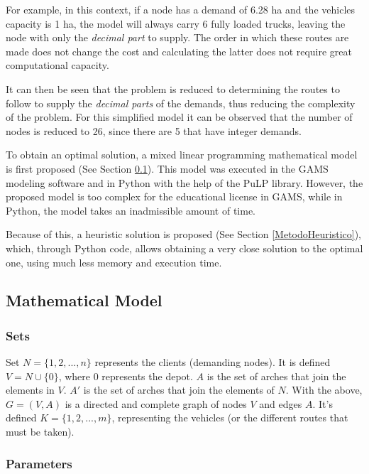 \documentclass{amsart}
\begin{document}
    For example, in this context, if a node has a demand of 6.28 ha and the vehicles capacity is 1 ha, the model will always carry 6 fully loaded trucks, leaving the node with only the \textit{decimal part} to supply. The order in which these routes are made does not change the cost and calculating the latter does not require great computational capacity.

    It can then be seen that the problem is reduced to determining the routes to follow to supply the \textit{decimal parts} of the demands, thus reducing the complexity of the problem. For this simplified model it can be observed that the number of nodes is reduced to 26, since there are 5 that have integer demands.

    To obtain an optimal solution, a mixed linear programming mathematical model is first proposed (See Section \ref{ModeloMatematico}). This model was executed in the GAMS modeling software and in Python with the help of the PuLP library. However, the proposed model is too complex for the educational license in GAMS, while in Python, the model takes an inadmissible amount of time.

        Because of this, a heuristic solution is proposed (See Section \ref{MetodoHeuristico}), which, through Python code, allows obtaining a very close solution to the optimal one, using much less memory and execution time.

    \subsection{Mathematical Model}\label{ModeloMatematico}
        \subsubsection{Sets} 
        
        
        Set $N=\{1, 2, ... , n\}$ represents the clients (demanding nodes). It is defined $V=N \cup \{0\}$, where $0$ represents the depot. $A$ is the set of arches that join the elements in $V$. $A'$ is the set of arches that join the elements of $N$. With the above, $G=(V, A)$ is a directed and complete graph of nodes $V$ and edges $A$. It's defined $K = \{1, 2, ..., m\}$, representing the vehicles (or the different routes that must be taken).
        

        \subsubsection{Parameters}
        
\end{document}
